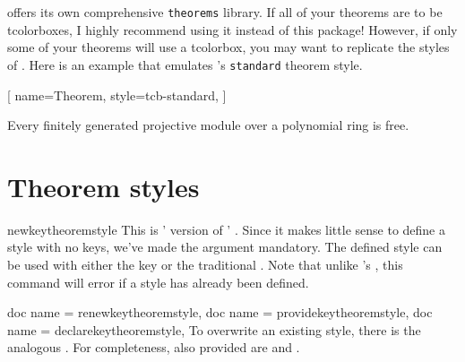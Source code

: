 \documentclass{ltxdoc}
\begin{document}
\fussy
{} offers its own comprehensive \texttt{theorems} library.
If all of your theorems are to be tcolorboxes, I highly recommend using it instead of this package! However, if only some of your theorems will use a tcolorbox, you may want to replicate the styles of .
Here is an example that emulates 's \texttt{standard} theorem style.

\begin{codepreamble}
[
  name=Theorem,
  style=tcb-standard,
  ]
\end{codepreamble}

\begin{keythmscode}[withpreamble]
\begin{mytheo}
Every finitely generated projective module over a polynomial ring is free.
\end{mytheo}
\end{keythmscode}

\section{Theorem styles}
\label{thmstyles}

\begin{docCommand}{newkeytheoremstyle}
  {}
This is ' version of ' .
Since it makes little sense to define a style with no keys, we've made the  argument mandatory.
The defined style can be used with either the  key or the traditional .
Note that unlike 's , this command will error if a style has already been defined.
\end{docCommand}

\begin{docCommands}[
  doc parameter=\marg{style name}\marg{options}
  ]
  {
    {doc name = renewkeytheoremstyle},
    {doc name = providekeytheoremstyle},
    {doc name = declarekeytheoremstyle},
  }
\sloppy
To overwrite an existing style, there is the analogous .
For completeness, also provided are  and .
\end{docCommands}
\end{document}
